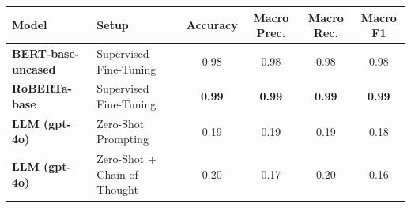 \begin{tabular}{llcccc}
\toprule
Model & Setup & Accuracy & Macro Prec. & Macro Rec. & Macro F1 \\
\midrule
\textbf{BERT-base-uncased} & Supervised Fine-Tuning & 0.98 & 0.98 & 0.98 & 0.98 \\
\textbf{RoBERTa-base} & Supervised Fine-Tuning & \textbf{0.99} & \textbf{0.99} & \textbf{0.99} & \textbf{0.99} \\
\textbf{LLM (gpt-4o)} & Zero-Shot Prompting & 0.19 & 0.19 & 0.19 & 0.18 \\
\textbf{LLM (gpt-4o)} & Zero-Shot + Chain-of-Thought & 0.20 & 0.17 & 0.20 & 0.16 \\
\bottomrule
\end{tabular}
